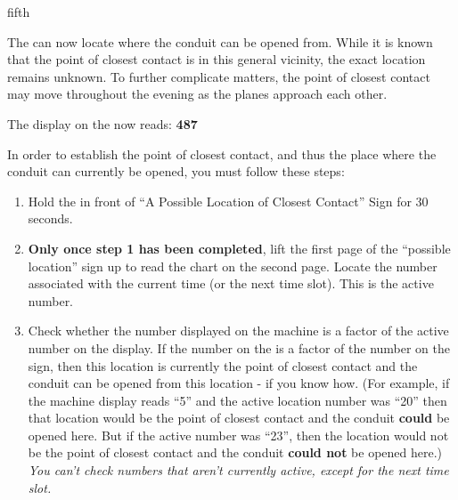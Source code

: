 \documentclass[notebook]{elementals}
\begin{document}
\begin{page}{fifth}

The \iTricorder{} can now locate where the conduit can be opened from. While it is known that the point of closest contact is in this general vicinity, the exact location remains unknown. To further complicate matters, the point of closest contact may move throughout the evening as the planes approach each other.

The display on the \iTricorder{} now reads: {\bf {\large 487}}

In order to establish the point of closest contact, and thus the place where the conduit can currently be opened, you must follow these steps:
\begin{enumerate}
  \item Hold the \iTricorder{} in front of ``A Possible Location of Closest Contact'' Sign for 30 seconds.
  \item {\bf Only once step 1 has been completed}, lift the first page of the ``possible location'' sign up to read the chart on the second page. Locate the number associated with the current time (or the next time slot). This is the active number.
  \item Check whether the number displayed on the machine is a factor of the active number on the \iTricorder{} display. If the number on the \iTricorder{} is a factor of the number on the sign, then this location is currently the point of closest contact and the conduit can be opened from this location - if you know how. (For example, if the machine display reads ``5'' and the active location number was ``20'' then that location would be the point of closest contact and the conduit {\bf could} be opened here. But if the active number was ``23'', then the location would not be the point of closest contact and the conduit {\bf could not} be opened here.) \emph{You can't check numbers that aren't currently active, except for the next time slot.} 
\end{enumerate}
\end{page}

\endnotebook
\end{document}
